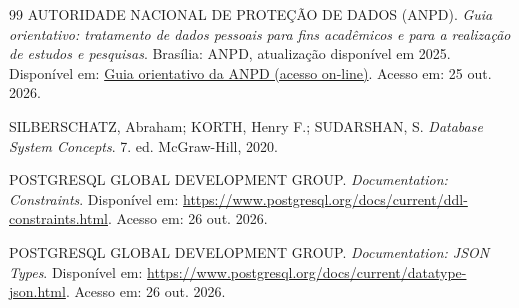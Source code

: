 \documentclass[12pt,a4paper,oneside]{report}
\begin{document}
\begin{thebibliography}{99}
AUTORIDADE NACIONAL DE PROTEÇÃO DE DADOS (ANPD). \textit{Guia orientativo: tratamento de dados pessoais para fins acadêmicos e para a realização de estudos e pesquisas}. Brasília: ANPD, atualização disponível em 2025. Disponível em: \href{https://www.gov.br/anpd/pt-br/centrais-de-conteudo/materiais-educativos-e-publicacoes/guia-orientativo-tratamento-de-dados-pessoais-para-fins-academicos-e-para-a-realizacao-de-estudos-e-pesquisas}{Guia orientativo da ANPD (acesso on-line)}. Acesso em: 25 out. 2026.

SILBERSCHATZ, Abraham; KORTH, Henry F.; SUDARSHAN, S. \textit{Database System Concepts}. 7. ed. McGraw-Hill, 2020.

POSTGRESQL GLOBAL DEVELOPMENT GROUP. \textit{Documentation: Constraints}. Disponível em: \url{https://www.postgresql.org/docs/current/ddl-constraints.html}. Acesso em: 26 out. 2026.

POSTGRESQL GLOBAL DEVELOPMENT GROUP. \textit{Documentation: JSON Types}. Disponível em: \url{https://www.postgresql.org/docs/current/datatype-json.html}. Acesso em: 26 out. 2026.

\end{thebibliography}
\end{document}
